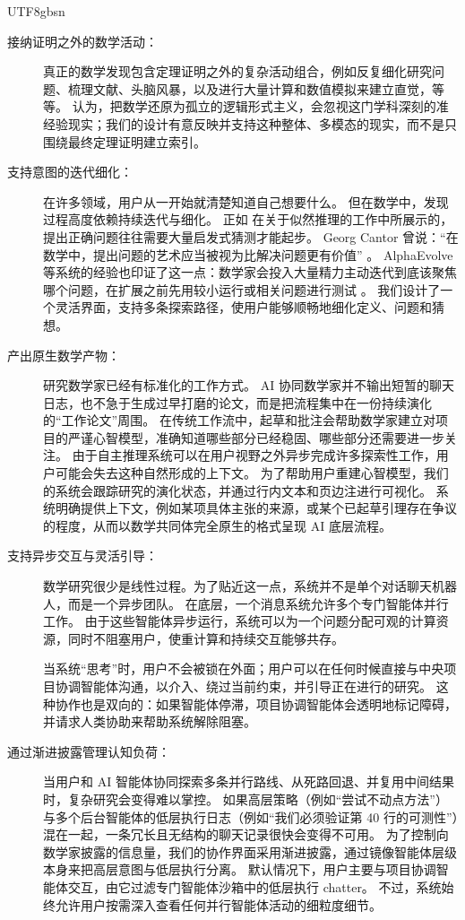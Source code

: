 \documentclass[11pt, a4paper, copyright, gdm]{google}
\begin{document}
\begin{CJK*}{UTF8}{gbsn}
\begin{description}
    
\item[接纳证明之外的数学活动：] 真正的数学发现包含定理证明之外的复杂活动组合，例如反复细化研究问题、梳理文献、头脑风暴，以及进行大量计算和数值模拟来建立直觉，等等。
\citet{putnam1975} 认为，把数学还原为孤立的逻辑形式主义，会忽视这门学科深刻的准经验现实；我们的设计有意反映并支持这种整体、多模态的现实，而不是只围绕最终定理证明建立索引。

\item[支持意图的迭代细化：] 在许多领域，用户从一开始就清楚知道自己想要什么。
但在数学中，发现过程高度依赖持续迭代与细化。
正如 \citet{polya1954} 在关于似然推理的工作中所展示的，提出正确问题往往需要大量启发式猜测才能起步。
Georg Cantor 曾说：“在数学中，提出问题的艺术应当被视为比解决问题更有价值” \citep[p.~27]{dauben1979}。
AlphaEvolve 等系统的经验也印证了这一点：数学家会投入大量精力主动迭代到底该聚焦哪个问题，在扩展之前先用较小运行或相关问题进行测试 \citep{romeraparedes2024, novikov2025}。
我们设计了一个灵活界面，支持多条探索路径，使用户能够顺畅地细化定义、问题和猜想。

\item[产出原生数学产物：] 研究数学家已经有标准化的工作方式。
AI 协同数学家并不输出短暂的聊天日志，也不急于生成过早打磨的论文，而是把流程集中在一份持续演化的“工作论文”周围。
在传统工作流中，起草和批注会帮助数学家建立对项目的严谨心智模型，准确知道哪些部分已经稳固、哪些部分还需要进一步关注。
由于自主推理系统可以在用户视野之外异步完成许多探索性工作，用户可能会失去这种自然形成的上下文。
为了帮助用户重建心智模型，我们的系统会跟踪研究的演化状态，并通过行内文本和页边注进行可视化。
系统明确提供上下文，例如某项具体主张的来源，或某个已起草引理存在争议的程度，从而以数学共同体完全原生的格式呈现 AI 底层流程。

\item[支持异步交互与灵活引导：] 数学研究很少是线性过程。为了贴近这一点，系统并不是单个对话聊天机器人，而是一个异步团队。
在底层，一个消息系统允许多个专门智能体并行工作。
由于这些智能体异步运行，系统可以为一个问题分配可观的计算资源，同时不阻塞用户，使重计算和持续交互能够共存。

当系统“思考”时，用户不会被锁在外面；用户可以在任何时候直接与中央项目协调智能体沟通，以介入、绕过当前约束，并引导正在进行的研究。
这种协作也是双向的：如果智能体停滞，项目协调智能体会透明地标记障碍，并请求人类协助来帮助系统解除阻塞。

\item[通过渐进披露管理认知负荷：] 当用户和 AI 智能体协同探索多条并行路线、从死路回退、并复用中间结果时，复杂研究会变得难以掌控。
如果高层策略（例如“尝试不动点方法”）与多个后台智能体的低层执行日志（例如“我们必须验证第 40 行的可测性”）混在一起，一条冗长且无结构的聊天记录很快会变得不可用。
为了控制向数学家披露的信息量，我们的协作界面采用渐进披露，通过镜像智能体层级本身来把高层意图与低层执行分离。
默认情况下，用户主要与项目协调智能体交互，由它过滤专门智能体沙箱中的低层执行 chatter。
不过，系统始终允许用户按需深入查看任何并行智能体活动的细粒度细节。


\end{description}
\end{CJK*}
\end{document}
